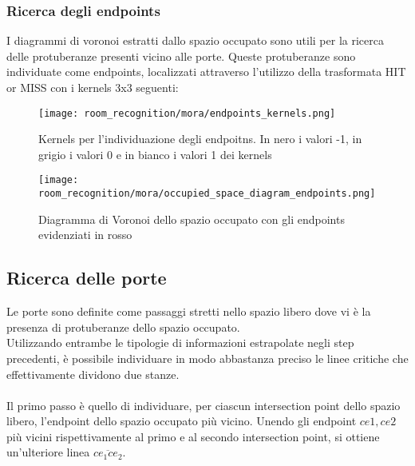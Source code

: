 \subsubsection{Ricerca degli endpoints}
I diagrammi di voronoi estratti dallo spazio occupato sono utili per la ricerca delle protuberanze presenti vicino alle porte. Queste protuberanze sono individuate come endpoints, localizzati attraverso l'utilizzo della trasformata HIT or MISS con i kernels 3x3 seguenti:
\begin{figure}[H]
  \centering
  \texttt{[image: room\_recognition/mora/endpoints\_kernels.png]}
  \caption{Kernels per l’individuazione degli endpoitns. In nero i valori -1, in grigio i valori 0 e in bianco i valori 1 dei kernels}
\end{figure}
\begin{figure}[H]
  \centering
  \texttt{[image: room\_recognition/mora/occupied\_space\_diagram\_endpoints.png]}
  \caption{Diagramma di Voronoi dello spazio occupato con gli endpoints evidenziati in rosso}
\end{figure}
\subsection{Ricerca delle porte}
Le porte sono definite come passaggi stretti nello spazio libero dove vi è la presenza di protuberanze dello spazio occupato.\\
Utilizzando entrambe le tipologie di informazioni estrapolate negli step precedenti, è possibile individuare in modo abbastanza preciso le linee critiche che effettivamente dividono due stanze. \\\\
Il primo passo è quello di individuare, per ciascun intersection point dello spazio libero, l'endpoint dello spazio occupato più vicino. Unendo gli endpoint $ce1, ce2$ più vicini rispettivamente al primo e al secondo intersection point, si ottiene un'ulteriore linea $\overline{ce_1ce_2}$.\\

